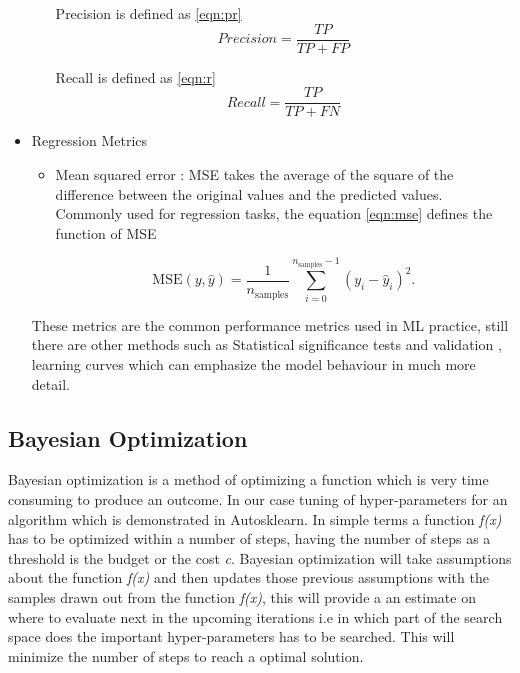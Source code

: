 \begin{itemize}
\begin{itemize}
        Precision is defined as \ref{eqn:pr}
         \begin{equation}
            Precision = \frac{TP}{TP + FP}
            \label{eqn:pr}
        \end{equation}
        
        Recall is defined as \ref{eqn:r}
         \begin{equation}
            Recall = \frac{TP}{TP + FN}
            \label{eqn:r}
        \end{equation}
        
    \end{itemize}
    
    
    \item Regression Metrics
    \begin{itemize}
        \item Mean squared error : MSE takes the average of the square of the difference between the original values and the predicted values. Commonly used for regression tasks, the equation \ref{eqn:mse} defines the function of MSE
        
        \begin{equation}
            \text{MSE}(y, \hat{y}) = \frac{1}{n_\text{samples}} \sum_{i=0}^{n_\text{samples} - 1} (y_i - \hat{y}_i)^2.
            \label{eqn:mse}
        \end{equation}
    \end{itemize}
    
    These metrics are the common performance metrics used in ML practice, still there are other methods such as Statistical significance tests and validation , learning curves which can emphasize the model behaviour in much more detail.
    
\end{itemize}



\subsection{Bayesian Optimization}

Bayesian optimization is a method of optimizing a function which is very time consuming to produce an outcome. In our case tuning of hyper-parameters for an algorithm which is demonstrated in Autosklearn\cite{autosklearn}. In simple terms a function \textit{f(x)} has to be optimized within a number of steps, having the number of steps as a threshold is the budget or the cost \textit{c}. Bayesian optimization will take assumptions about the function \textit{f(x)} and then updates those previous assumptions with the samples drawn out from the function \textit{f(x)}, this will provide a an estimate on where to evaluate next in the upcoming iterations i.e in which part of the search space does the important hyper-parameters has to be searched. This will minimize the number of steps to reach a optimal solution.